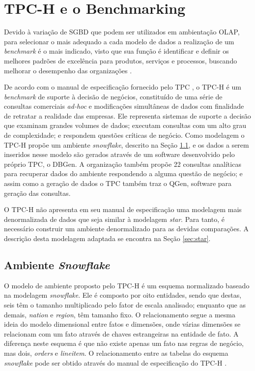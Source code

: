 \documentclass[conference]{IEEEtran}
\begin{document}
\section{TPC-H e o Benchmarking}

Devido à variação de SGBD que podem ser utilizados em ambientação OLAP, para selecionar o mais adequado a cada modelo de dados a realização de um \textit{benchmark} é o mais indicado, visto que sua função é identificar e definir os melhores padrões de excelência para produtos, serviços e processos, buscando melhorar o desempenho das organizações \cite{kyro2003revising,bhutta1999benchmarking}.

De acordo com o manual de especificação fornecido pelo TPC \cite{tpc2017specs}, o TPC-H é um \textit{benchmark} de suporte à decisão de negócios, constituído de uma série de consultas comerciais \textit{ad-hoc} e modificações simultâneas de dados com finalidade de retratar a realidade das empresas. Ele representa sistemas de suporte a decisão que examinam grandes volumes de dados; executam consultas com um alto grau de complexidade; e respondem questões críticas de negócio. Como modelagem o TPC-H propõe um ambiente \textit{snowflake}, descrito na Seção \ref{sec:snowflake}, e os dados a serem inseridos nesse modelo são gerados através de um software desenvolvido pelo próprio TPC, o DBGen. A organização também propõe 22 consultas analíticas para recuperar dados do ambiente respondendo a alguma questão de negócio; e assim como a geração de dados o TPC também traz o QGen, software para geração das consultas.

O TPC-H não apresenta em seu manual de especificação uma modelagem mais denormalizada de dados que seja similar à modelagem \textit{star}. Para tanto, é necessário construir um ambiente denormalizado para as devidas comparações. A descrição desta modelagem adaptada se encontra na Seção \ref{sec:star}.

\subsection{Ambiente \textit{Snowflake}}
\label{sec:snowflake}

O modelo de ambiente proposto pelo TPC-H é um esquema normalizado baseado na modelagem \textit{snowflake}. Ele é composto por oito entidades, sendo que destas, seis têm o tamanho multiplicado pelo fator de escala analisado; enquanto que as demais, \textit{nation} e \textit{region}, têm tamanho fixo. O relacionamento segue a mesma ideia do modelo dimensional entre fatos e dimensões, onde várias dimensões se relacionam com um fato através de chaves estrangeiras na entidade de fato. A diferença neste esquema é que não existe apenas um fato nas regras de negócio, mas dois, \textit{orders} e \textit{lineitem}. O relacionamento entre as tabelas do esquema \textit{snowflake} pode ser obtido através do manual de especificação do TPC-H \cite{tpc2017specs}.
\end{document}
